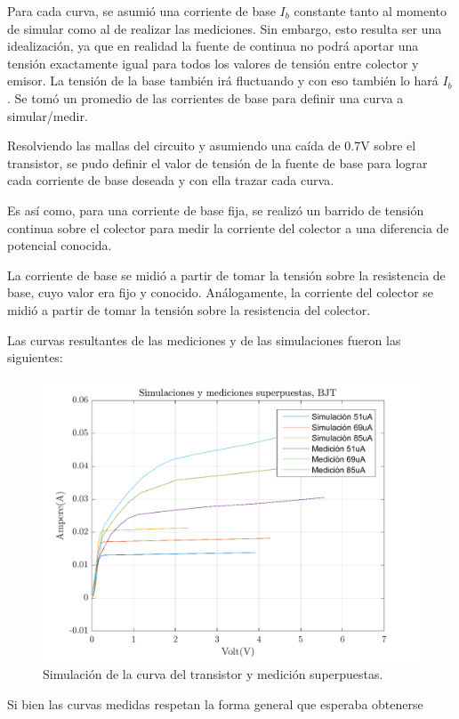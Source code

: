 \documentclass[../../e1_tp1_main.tex]{subfiles}
\begin{document}
	Para cada curva, se asumió una corriente de base $I_b$ constante tanto al momento de simular como al de realizar las mediciones. Sin embargo, esto resulta ser una idealización, ya que en realidad la fuente de continua no podrá aportar una tensión exactamente igual para todos los valores de tensión entre colector y emisor. La tensión de la base también irá fluctuando y con eso también lo hará $I_b$. Se tomó un promedio de las corrientes de base para definir una curva a simular/medir.\par
	Resolviendo las mallas del circuito y asumiendo una caída de 0.7V sobre el transistor, se pudo definir el valor de tensión de la fuente de base para lograr cada corriente de base deseada y con ella trazar cada curva.\par
	Es así como, para una corriente de base fija, se realizó un barrido de tensión continua sobre el colector para medir la corriente del colector a una diferencia de potencial conocida.\par
	La corriente de base se midió a partir de tomar la tensión sobre la resistencia de base, cuyo valor era fijo y conocido. Análogamente, la corriente del colector se midió a partir de tomar la tensión sobre la resistencia del colector.\par
	
	Las curvas resultantes de las mediciones y de las simulaciones fueron las siguientes:	
	
		\begin{figure}[H]	%
		\centering
		\includegraphics[scale=0.2]{imagenes/transistor_simulacion_medicion.png}
		\caption{Simulación de la curva del transistor y medición superpuestas.}
		\label{fig:ej5_transistor_simulacion_medicion}
	\end{figure}
	
Si bien las curvas medidas respetan la forma general que esperaba obtenerse
\end{document}
